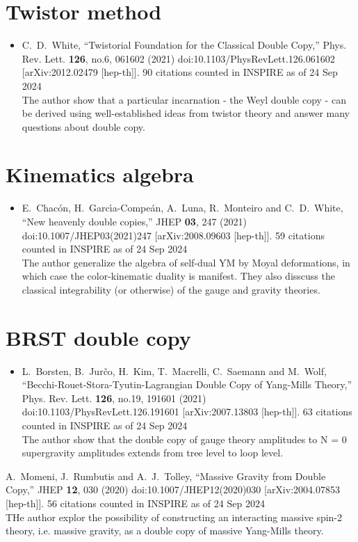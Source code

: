 \documentclass[a4paper,12pt]{article}
\begin{document}
\section*{Twistor method}
\begin{itemize}
    \item %
    C.~D.~White,
    ``Twistorial Foundation for the Classical Double Copy,''
    Phys. Rev. Lett. \textbf{126}, no.6, 061602 (2021)
    doi:10.1103/PhysRevLett.126.061602
    [arXiv:2012.02479 [hep-th]].
    90 citations counted in INSPIRE as of 24 Sep 2024\\
    The author show that a particular incarnation - the Weyl double copy - can be derived using well-established
ideas from twistor theory and answer many questions about double copy.
\end{itemize}
\section*{Kinematics algebra}
\begin{itemize}
    \item %
    E.~Chac\'on, H.~Garc\'\i{}a-Compe\'an, A.~Luna, R.~Monteiro and C.~D.~White,
    ``New heavenly double copies,''
    JHEP \textbf{03}, 247 (2021)
    doi:10.1007/JHEP03(2021)247
    [arXiv:2008.09603 [hep-th]].
    59 citations counted in INSPIRE as of 24 Sep 2024\\
    The author generalize the algebra of self-dual YM by  Moyal deformations, in which case the color-kinematic duality is manifest.
    They also disscuss the classical integrability (or otherwise) of the gauge and gravity theories.
\end{itemize}
\section*{BRST double copy}
\begin{itemize}
    \item %
    L.~Borsten, B.~Jur\v{c}o, H.~Kim, T.~Macrelli, C.~Saemann and M.~Wolf,
    ``Becchi-Rouet-Stora-Tyutin-Lagrangian Double Copy of Yang-Mills Theory,''
    Phys. Rev. Lett. \textbf{126}, no.19, 191601 (2021)
    doi:10.1103/PhysRevLett.126.191601
    [arXiv:2007.13803 [hep-th]].
    63 citations counted in INSPIRE as of 24 Sep 2024\\
    The author show that the double copy of gauge theory amplitudes to N = 0 supergravity amplitudes extends from tree level to loop level.
\end{itemize}
A.~Momeni, J.~Rumbutis and A.~J.~Tolley,
``Massive Gravity from Double Copy,''
JHEP \textbf{12}, 030 (2020)
doi:10.1007/JHEP12(2020)030
[arXiv:2004.07853 [hep-th]].
56 citations counted in INSPIRE as of 24 Sep 2024\\
THe author explor the possibility of constructing an interacting massive spin-2 theory, i.e.
massive gravity, as a double copy of massive Yang-Mills theory.
    
\end{document}
